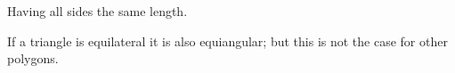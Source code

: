 Having all sides the same length.
\par
If a triangle is equilateral it is also
equiangular; but this is not the case 
for other polygons.